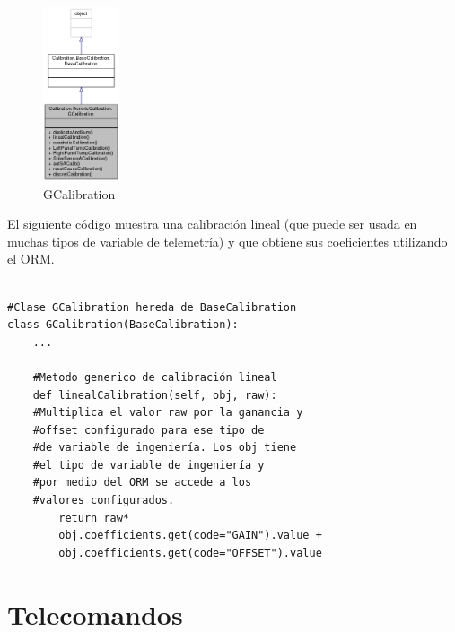 \documentclass[twoside,twocolumn]{article}
\begin{document}


\begin{figure}[]
  \caption{GCalibration}
  \label{fig:GCalibration}
  \centering
  \includegraphics[width=0.2\textwidth]{Imagenes/GenericCalibration.png}
\end{figure}


El siguiente código muestra una calibración lineal (que puede ser usada en muchas tipos de variable de telemetría) y que obtiene sus coeficientes utilizando el ORM.

\begin{verbatim}

#Clase GCalibration hereda de BaseCalibration
class GCalibration(BaseCalibration):
    ...
  
    #Metodo generico de calibración lineal
    def linealCalibration(self, obj, raw):
	#Multiplica el valor raw por la ganancia y 
	#offset configurado para ese tipo de
	#de variable de ingeniería. Los obj tiene 
	#el tipo de variable de ingeniería y
	#por medio del ORM se accede a los 
	#valores configurados.
        return raw*
	    obj.coefficients.get(code="GAIN").value + 
	    obj.coefficients.get(code="OFFSET").value

\end{verbatim}

\section{Telecomandos}
\label{sec:telecomandos}
\end{document}
